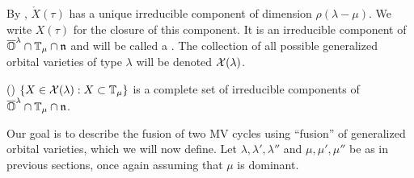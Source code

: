 \documentclass[draft]{article} %
\begin{document}
By \cite[Prop.\ 4.5.4]{dthesis}, $ \mathring X(\tau) $ has a unique irreducible component of dimension $ \rho(\lambda - \mu)$.  We write $ X(\tau)$ for the closure of this component.  It is an irreducible component of $ \overline{\mathbb O}^\lambda \cap \mathbb T_\mu \cap \mathfrak n$ and will be called a . 
% 
The collection of all possible generalized orbital varieties of type $\lambda$ will be denoted $\mathcal{X}(\lambda)$. 
% 
% 
\begin{theorem}(\cite[Theorem~4.8.2]{dthesis})
    \label{pr:govsasirrecs}
    $\{X\in\mathcal{X}(\lambda):X\subset\mathbb T_\mu\}$
    is a complete set of irreducible components of $\overline{\mathbb O}^\lambda\cap\mathbb T_\mu\cap\mathfrak n$. 
\end{theorem}
% 

% 
Our goal is to describe the fusion of two MV cycles using ``fusion'' of generalized orbital varieties, which we will now define. 
% 
Let $\lambda,\lambda',\lambda''$ and $\mu, \mu',\mu''$ be as in previous sections, once again assuming that $\mu$ is dominant.
\end{document}
